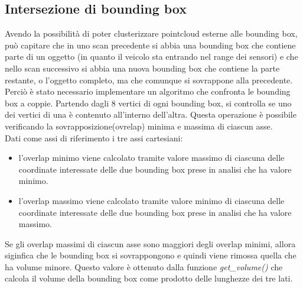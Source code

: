 \documentclass[italian]{article}
\begin{document}
\subsection{Intersezione di bounding box}
Avendo la possibilità di poter clusterizzare pointcloud esterne alle bounding box, può capitare che in uno scan precedente si abbia una bounding box che contiene parte di un oggetto (in quanto il veicolo sta entrando nel range dei sensori) e che nello scan successivo si abbia una nuova bounding box che contiene la parte restante, o l'oggetto completo, ma che comunque si sovrappone alla precedente.\\
Perciò è stato necessario implementare un algoritmo che confronta le bounding box a coppie. Partendo dagli 8 vertici di ogni bounding box, si controlla se uno dei vertici di una è contenuto all'interno dell'altra. Questa operazione è possibile verificando la sovrapposizione(ovrelap) minima e massima di ciascun asse.\\
Dati come assi di riferimento i tre assi cartesiani:
\begin{itemize}
	\item l'overlap minimo viene calcolato tramite valore massimo di ciascuna delle coordinate interessate delle due bounding box prese in analisi che ha valore minimo.
	\item l'overlap massimo viene calcolato tramite valore minimo di ciascuna delle coordinate interessate delle due bounding box prese in analisi che ha valore massimo.
\end{itemize}
Se gli overlap massimi di ciascun asse sono maggiori degli overlap minimi, allora siginfica che le bounding box si sovrappongono e quindi viene rimossa quella che ha volume minore. Questo valore è ottenuto dalla funzione \textit{get\_volume()} che calcola il volume della bounding box come prodotto delle lunghezze dei tre lati.\\
\end{document}
